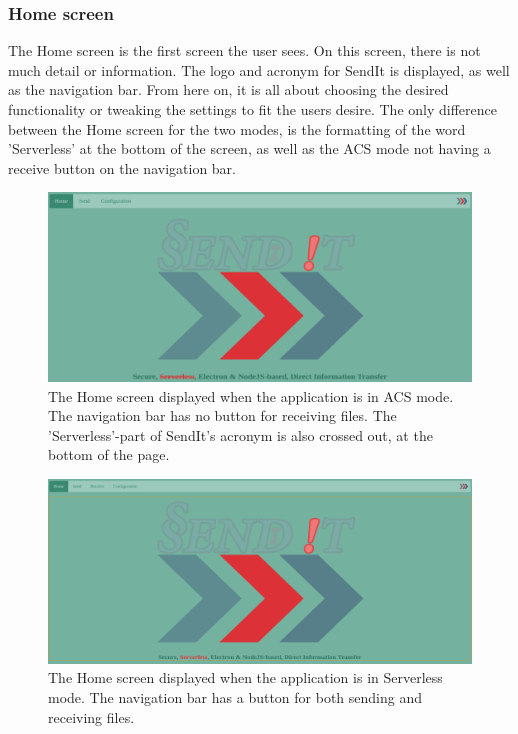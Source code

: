   \subsubsection*{Home screen}
  The Home screen is the first screen the user sees. On this screen, there is not much detail or information. The logo and acronym for SendIt is displayed, as well as the navigation bar. From here on, it is all about choosing the desired functionality or tweaking the settings to fit the users desire. The only difference between the Home screen for the two modes, is the formatting of the word 'Serverless' at the bottom of the screen, as well as the ACS mode not having a receive button on the navigation bar.
    \begin{figure}[H]
      \centering
      \includegraphics[width=\textwidth]{Figures/Base/Home_Screen}
      \decoRule
      \caption[SendIt ACS mode: Home screen]{The Home screen displayed when the application is in ACS mode. The navigation bar has no button for receiving files. The 'Serverless'-part of SendIt's acronym is also crossed out, at the bottom of the page.}
      \label{fig:hs_acs}
    \end{figure}

    \begin{figure}[H]
      \centering
      \includegraphics[width=\textwidth]{Figures/Base/Home_Screen_SL}
      \decoRule
      \caption[SendIt Serverless mode: Home screen]{The Home screen displayed when the application is in Serverless mode. The navigation bar has a button for both sending and receiving files.}
      \label{fig:hs_sl}
    \end{figure}


